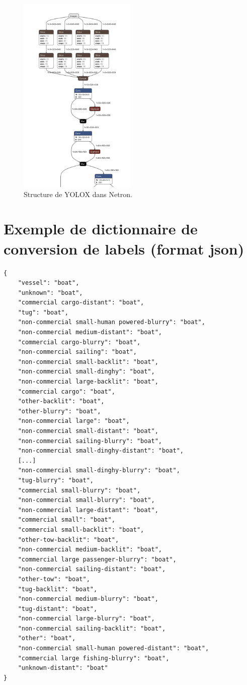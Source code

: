 \begin{figure}[h]
    \centering
    \includegraphics[width=0.5\textwidth]{./img/netron.png}
    \caption{Structure de YOLOX dans Netron.}
    \label{netron}
\end{figure}

\pagebreak

\chapter{Exemple de dictionnaire de conversion de labels (format json)}

\begin{verbatim}
{
    "vessel": "boat",
    "unknown": "boat",
    "commercial cargo-distant": "boat",
    "tug": "boat",
    "non-commercial small-human powered-blurry": "boat",
    "non-commercial medium-distant": "boat",
    "commercial cargo-blurry": "boat",
    "non-commercial sailing": "boat",
    "non-commercial small-backlit": "boat",
    "non-commercial small-dinghy": "boat",
    "non-commercial large-backlit": "boat",
    "commercial cargo": "boat",
    "other-backlit": "boat",
    "other-blurry": "boat",
    "non-commercial large": "boat",
    "non-commercial small-distant": "boat",
    "non-commercial sailing-blurry": "boat",
    "non-commercial small-dinghy-distant": "boat",
    [...]
    "non-commercial small-dinghy-blurry": "boat",
    "tug-blurry": "boat",
    "commercial small-blurry": "boat",
    "non-commercial small-blurry": "boat",
    "non-commercial large-distant": "boat",
    "commercial small": "boat",
    "commercial small-backlit": "boat",
    "other-tow-backlit": "boat",
    "non-commercial medium-backlit": "boat",
    "commercial large passenger-blurry": "boat",
    "non-commercial sailing-distant": "boat",
    "other-tow": "boat",
    "tug-backlit": "boat",
    "non-commercial medium-blurry": "boat",
    "tug-distant": "boat",
    "non-commercial large-blurry": "boat",
    "non-commercial sailing-backlit": "boat",
    "other": "boat",
    "non-commercial small-human powered-distant": "boat",
    "commercial large fishing-blurry": "boat",
    "unknown-distant": "boat"
}
\end{verbatim}
\label{ex_dictionnaire_conversion}

